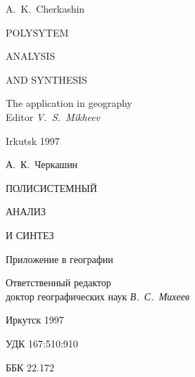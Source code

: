 \documentclass[14pt,draft,openany]{extbook}
\begin{document}

\begingroup
\thispagestyle{empty}
\mbox{}

\ptsans
\vspace{13ex}
\centering\large
\noindent{}A.~K.~Cherkashin

\vspace{6ex}

{\Huge\bfseries

POLYSYTEM

ANALYSIS

AND SYNTHESIS

}
\vspace{1em}

The application in geography
\\[0.7em]
{\normalsize{} Editor {\itshape{} V.~S.~Mikheev}}
\vfill{}

Irkutsk 1997
\mbox{}

\endgroup
\newpage
\begingroup
\mbox{}
\thispagestyle{empty}

\ptsans
\vspace{13ex}
\centering\large
\noindent{}А.~К.~Черкашин

\vspace{6ex}

{\Huge\bfseries

ПОЛИСИСТЕМНЫЙ

АНАЛИЗ

И СИНТЕЗ

}
\vspace{1em}

Приложение в географии
\vspace{1em}

{\normalsize\parskip0pt
Ответственный редактор\\[-0.5em] доктор географических наук {\itshape В.~С.~Михеев}}
\vfill{}

Иркутск 1997
\mbox{}

\endgroup
\newpage{}
\begingroup
\newcommand\sucopyright{{\ptserif\copyright}}
\newcommand\ISBN{ISBN 5--02--030607--X}
\thispagestyle{empty}
\noindent{}УДК 167:510:910

\noindent{}ББК 22.172

\vspace{2em}
\end{document}
